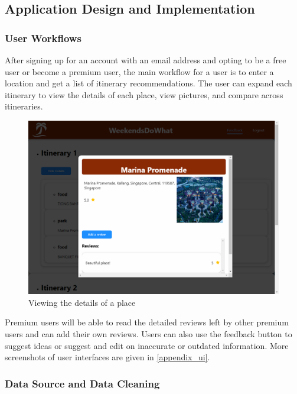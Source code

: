 \documentclass[12pt,a4paper]{article}
\begin{document}
    \subsection{Application Design and Implementation}
        \subsubsection{User Workflows}
        
        After signing up for an account with an email address and opting to be a free user or become a premium user, the main workflow for a user is to enter a location and get a list of itinerary recommendations. The user can expand each itinerary to view the details of each place, view pictures, and compare across itineraries.
        
        \begin{figure}[H]
        	\centering
        	\includegraphics[width=1\textwidth]{figures/ui-place-details.png}
        	\caption{Viewing the details of a place}
        	\label{view_place_details}
        \end{figure}
        
        Premium users will be able to read the detailed reviews left by other premium users and can add their own reviews. Users can also use the feedback button to suggest ideas or suggest and edit on inaccurate or outdated information. More screenshots of user interfaces are given in \autoref{appendix_ui}.
    
        \subsubsection{Data Source and Data Cleaning}
        
\end{document}
